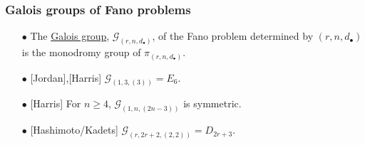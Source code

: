 \documentclass{beamer}
\theoremstyle{definition}
\newcommand{\blue}[1]{{\color{black!15!blue}\underline{#1}}}
\begin{document}
\begin{frame}
\frametitle{Galois groups of Fano problems}
\hspace{-.65cm}
\begin{minipage}{.71\textwidth}
\begin{enumerate}
\item[$\bullet$] The \blue{Galois group}, $\mathcal{G}_{(r,n,d_\bullet)}$, of the Fano problem determined by $(r,n,d_\bullet)$ is the monodromy group of $\pi_{(r,n,d_\bullet)}$.

\vspace{.1cm}

\item[$\bullet$] [Jordan],[Harris] $\mathcal{G}_{(1,3,(3))} = E_6$.

\vspace{.1cm}

\item[$\bullet$] [Harris] For $n\ge 4$, $\mathcal{G}_{(1,n,(2n-3))}$ is symmetric.

\vspace{.1cm}

\item[$\bullet$] [Hashimoto/Kadets] $\mathcal{G}_{(r,2r+2,(2,2))} = D_{2r+3}$.

\vspace{.1cm}


\end{enumerate}
\end{minipage}
\end{frame}
\end{document}
